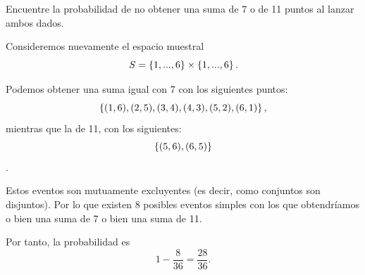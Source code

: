 \begin{problema}
	\label{problema:2.6}
	Encuentre la probabilidad de no obtener una suma de 7 o de 11 puntos al lanzar ambos dados.
\end{problema}


\begin{solucion}
	\label{solucion:2.6}
	Consideremos nuevamente el espacio muestral 
	\[
		S = \left\{ 1,...,6 \right\}\times\left\{ 1,...,6 \right\}.
	\]

	Podemos obtener una suma igual con 7 con los siguientes puntos:
	\[
		\left\{ (1,6),(2,5),(3,4),(4,3),(5,2),(6,1) \right\}, 
	\]
	mientras que la de 11, con los siguientes:
	\[\label{key}
		\left\{ (5,6), (6,5) \right\}
	\].

	Estos eventos son mutuamente excluyentes (es decir, como conjuntos son disjuntos). Por lo que existen 8 posibles eventos simples con los que obtendríamos o bien una suma de 7 o bien una suma de 11.
	
	Por tanto, la probabilidad es
	\[\label{key}
		1-\dfrac{8}{36}=\dfrac{28}{36}.
	\]
\end{solucion}